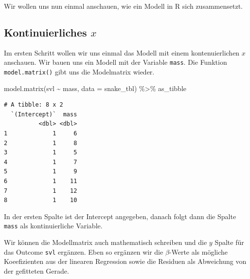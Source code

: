 \documentclass[
  letterpaper,
]{scrbook}
\newenvironment{Shaded}{\begin{snugshade}}{\end{snugshade}}
\newcommand{\AttributeTok}[1]{\textcolor[rgb]{0.40,0.45,0.13}{#1}}
\newcommand{\FunctionTok}[1]{\textcolor[rgb]{0.28,0.35,0.67}{#1}}
\newcommand{\NormalTok}[1]{\textcolor[rgb]{0.00,0.23,0.31}{#1}}
\newcommand{\SpecialCharTok}[1]{\textcolor[rgb]{0.37,0.37,0.37}{#1}}
\begin{document}
Wir wollen uns nun einmal anschauen, wie ein Modell in R sich
zusammensetzt.

\hypertarget{kontinuierliches-x}{%
\subsection{\texorpdfstring{Kontinuierliches
\(x\)}{Kontinuierliches x}}\label{kontinuierliches-x}}

Im ersten Schritt wollen wir uns einmal das Modell mit einem
kontenuierlichen \(x\) anschauen. Wir bauen uns ein Modell mit der
Variable \texttt{mass}. Die Funktion \texttt{model.matrix()} gibt uns
die Modelmatrix wieder.

\begin{Shaded}
\begin{Highlighting}[]
\FunctionTok{model.matrix}\NormalTok{(svl }\SpecialCharTok{\textasciitilde{}}\NormalTok{ mass, }\AttributeTok{data =}\NormalTok{ snake\_tbl) }\SpecialCharTok{\%\textgreater{}\%}\NormalTok{ as\_tibble}
\end{Highlighting}
\end{Shaded}

\begin{verbatim}
# A tibble: 8 x 2
  `(Intercept)`  mass
          <dbl> <dbl>
1             1     6
2             1     8
3             1     5
4             1     7
5             1     9
6             1    11
7             1    12
8             1    10
\end{verbatim}

In der ersten Spalte ist der Intercept angegeben, danach folgt dann die
Spalte \texttt{mass} als kontinuierliche Variable.

Wir können die Modellmatrix auch mathematisch schreiben und die \(y\)
Spalte für das Outcome \texttt{svl} ergänzen. Eben so ergänzen wir die
\(\beta\)-Werte als mögliche Koeefizienten aus der linearen Regression
sowie die Residuen als Abweichung von der gefitteten Gerade.
\end{document}
